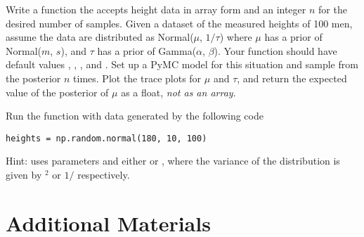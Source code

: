 \begin{problem}
Write a function the accepts height data in array form and an integer $n$ for the desired number of samples.
Given a dataset of the measured heights of 100 men, assume the data are distributed as Normal($\mu$, $1/\tau$) where $\mu$ has a prior of Normal($m$, $s$), and $\tau$ has a prior of Gamma($\alpha$, $\beta$).
Your function should have default values , , , and .
Set up a PyMC model for this situation and sample from the posterior $n$ times.
Plot the trace plots for $\mu$ and $\tau$, and return the expected value of the posterior of $\mu$ as a float, \emph{not as an array}.

Run the function with data generated by the following code
\begin{lstlisting}
heights = np.random.normal(180, 10, 100)
\end{lstlisting}
\noindent Hint:  uses parameters  and either  or , where the variance of the distribution is given by $^2$ or $1/$ respectively.
\end{problem}


\newpage
\section*{Additional Materials}

